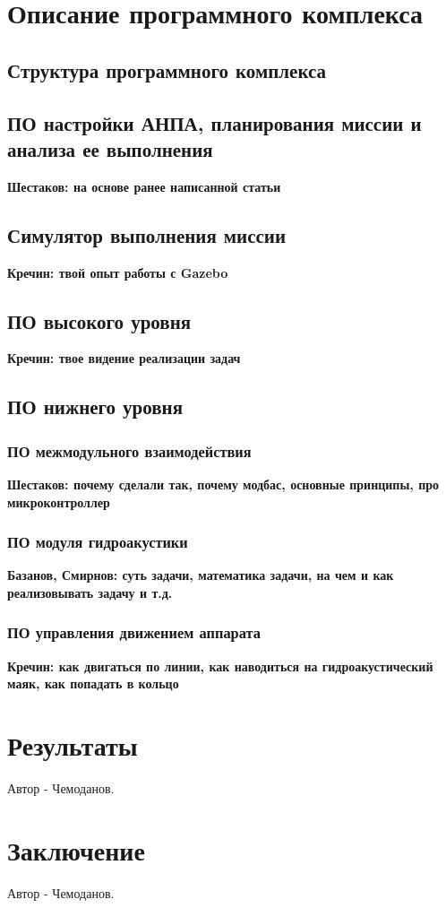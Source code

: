 	
\section{Описание программного комплекса}
\subsection{Структура программного комплекса}

\subsection{ПО настройки АНПА, планирования миссии и анализа ее выполнения}
	\textbf{Шестаков: на основе ранее написанной статьи}

\subsection{Симулятор выполнения миссии}
	\textbf{Кречин: твой опыт работы с Gazebo}
	
\subsection{ПО высокого уровня}
	\textbf{Кречин: твое видение реализации задач}
	
\subsection{ПО нижнего уровня}
\subsubsection{ПО межмодульного взаимодействия}
	\textbf{Шестаков: почему сделали так, почему модбас, основные принципы, про микроконтроллер}

\subsubsection{ПО модуля гидроакустики}
	\textbf{Базанов, Смирнов: суть задачи, математика задачи, на чем и как реализовывать задачу и т.д.}


\subsubsection{ПО управления движением аппарата}
	\textbf{Кречин: как двигаться по линии, как наводиться на гидроакустический маяк, как попадать в кольцо}

	
\section{Результаты}

Автор - Чемоданов.

\section{Заключение}

Автор - Чемоданов.
